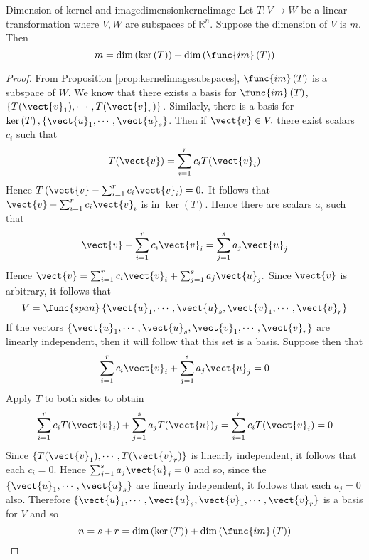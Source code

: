\begin{theorem}{Dimension of kernel and image}{dimensionkernelimage}
Let $T:V\rightarrow W$ be a linear transformation where $V,W$ are subspaces of $\mathbb{R}^n$. Suppose the dimension of $V$ is $m$. Then 
\[
m=\dim \left( \ker \left( T\right) \right) +\dim \left( \func{im}\left(
T\right) \right) 
\]
\end{theorem}

\begin{proof}
From Proposition \ref{prop:kernelimagesubspaces}, $\func{im}\left( T\right) $ is a subspace of $W.$ We know that there exists a basis for $\func{im}\left( T\right)$, $\left\{ T(\vect{v}
_{1}),\cdots ,T(\vect{v}_{r})\right\} . $ Similarly, there is a basis for $\ker
\left( T\right) ,\left\{ \vect{u}_{1},\cdots ,\vect{u}_{s}\right\} $. Then if $
\vect{v}\in V,$ there exist scalars $c_{i}$ such that 
\begin{equation*}
T(\vect{v})=\sum_{i=1}^{r}c_{i}T(\vect{v}_{i})
\end{equation*}
Hence $T\left( \vect{v}-\sum_{i=1}^{r}c_{i}\vect{v}_{i}\right) =0.$ It follows
that $\vect{v}-\sum_{i=1}^{r}c_{i}\vect{v}_{i}$ is in $\ker \left( T\right) $.
Hence there are scalars $a_{i}$ such that 
\begin{equation*}
\vect{v}-\sum_{i=1}^{r}c_{i}\vect{v}_{i}=\sum_{j=1}^{s}a_{j}\vect{u}_{j}
\end{equation*}
Hence $\vect{v}=\sum_{i=1}^{r}c_{i}\vect{v}_{i}+\sum_{j=1}^{s}a_{j}\vect{u}
_{j}. $ Since $\vect{v}$ is arbitrary, it follows that 
\begin{equation*}
V=\func{span}\left\{ \vect{u}_{1},\cdots ,\vect{u}_{s},\vect{v}_{1},\cdots ,
\vect{v}_{r}\right\}
\end{equation*}
If the vectors $\left\{ \vect{u}_{1},\cdots ,\vect{u}_{s},\vect{v}_{1},\cdots ,
\vect{v}_{r}\right\} $ are linearly independent, then it will follow that
this set is a basis. Suppose then that 
\begin{equation*}
\sum_{i=1}^{r}c_{i}\vect{v}_{i}+\sum_{j=1}^{s}a_{j}\vect{u}_{j}=0
\end{equation*}
Apply $T$ to both sides to obtain 
\begin{equation*}
\sum_{i=1}^{r}c_{i}T(\vect{v}_{i})+\sum_{j=1}^{s}a_{j}T(\vect{u})
_{j}=\sum_{i=1}^{r}c_{i}T(\vect{v}_{i})=0
\end{equation*}
Since $\left\{ T(\vect{v}_{1}),\cdots ,T(\vect{v}_{r})\right\} $ is linearly
independent, it follows that each $c_{i}=0.$ Hence $\sum_{j=1}^{s}a_{j}\vect{u
}_{j}=0$ and so, since the $\left\{ \vect{u}_{1},\cdots ,\vect{u}_{s}\right\} $
are linearly independent, it follows that each $a_{j}=0$ also. Therefore $\left\{ \vect{u}_{1},\cdots ,\vect{u}_{s},\vect{v}_{1},\cdots ,\vect{v}
_{r}\right\} $ is a basis for $V$ and so 
\begin{equation*}
n=s+r=\dim \left( \ker \left( T\right) \right) +\dim \left( \func{im}\left(
T\right) \right) 
\end{equation*}
\end{proof}

